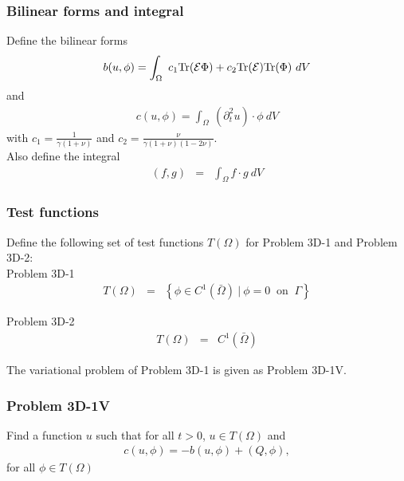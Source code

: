 \documentclass[../../main.tex]{subfiles}
\begin{document}
\subsubsection{Bilinear forms and integral}\label{sssec:3D_Model:BilinearForm}
Define the bilinear forms
\begin{eqnarray}
	b(u,\phi) = \int_\Omega~c_1\textrm{Tr}({\cal E}\Phi)+ c_2\textrm{Tr}({\cal E})
	\textrm{Tr}(\Phi) ~dV \label{eq:3D_Model:Bilinear}
\end{eqnarray}
and
\begin{eqnarray}
	c(u,\phi) = \int_\Omega~ (\partial^2_t u) \cdot \phi~dV \label{eq:3D_Model:Bilinear_c}
\end{eqnarray}
with $\displaystyle c_1 = \frac{1}{\gamma(1+\nu)}$ and $\displaystyle c_2 = \frac{\nu}{\gamma(1+\nu)(1-2\nu)}$.\\

Also define the integral
\begin{eqnarray}
	(f,g) &=& \int_{\Omega} f\cdot g \ dV \label{eq:3D_Model:Bilinear_int}
\end{eqnarray}

\subsubsection{Test functions}\label{sssec:3D_Model:TestFunction}
Define the following set of test functions $T(\Omega)$ for Problem 3D-1 and Problem 3D-2:\\

Problem 3D-1
\begin{eqnarray*}
	T(\Omega) & = & \left\{ \phi \in C^1(\bar{\Omega}) \ | \ \phi = 0 \ \textrm{ on } \ \Gamma \right\}
\end{eqnarray*}

Problem 3D-2
\begin{eqnarray*}
	T(\Omega) & = &  C^1(\bar{\Omega})
\end{eqnarray*}

The variational problem of Problem 3D-1 is given as Problem 3D-1V.

\subsubsection{Problem 3D-1V}\label{sssec:3D_Model:Problem3D1V}
Find a function $u$ such that for all $t>0$, $u \in T(\Omega)$ and 
\begin{align}
	c(u,\phi) = -b(u,\phi) + (Q,\phi), \label{eq:3D_Model:Problem3D1VEq}
\end{align}
for all $\phi \in T(\Omega)$\\
\end{document}
